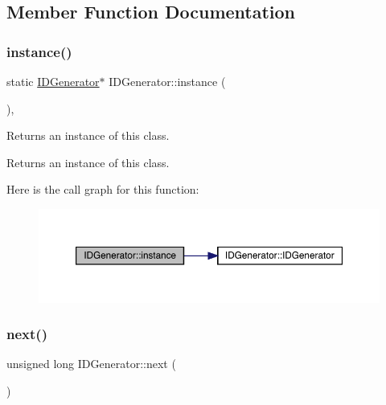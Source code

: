 \subsection{Member Function Documentation}
\mbox{\label{class_i_d_generator_ad852c6dadc89e1020e4b3932f5a97bb3}} 
\subsubsection{\texorpdfstring{instance()}{instance()}}
{\footnotesize\ttfamily static \mbox{\hyperlink{class_i_d_generator}{I\+D\+Generator}}$\ast$ I\+D\+Generator\+::instance (\begin{DoxyParamCaption}{ }\end{DoxyParamCaption})\hspace{0.3cm}{\ttfamily [inline]}, {\ttfamily [static]}}

Returns an instance of this class. \begin{DoxyReturn}{Returns}
an instance of this class. 
\end{DoxyReturn}
Here is the call graph for this function\+:\nopagebreak
\begin{figure}[H]
\begin{center}
\leavevmode
\includegraphics[width=350pt]{class_i_d_generator_ad852c6dadc89e1020e4b3932f5a97bb3_cgraph}
\end{center}
\end{figure}
\mbox{\label{class_i_d_generator_a99d8cabb2ec6a17888a8ccbe9c85fee0}} 
\subsubsection{\texorpdfstring{next()}{next()}}
{\footnotesize\ttfamily unsigned long I\+D\+Generator\+::next (\begin{DoxyParamCaption}{ }\end{DoxyParamCaption})\hspace{0.3cm}{\ttfamily [inline]}}

